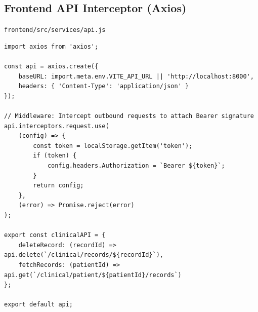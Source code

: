 \documentclass[a4paper,12pt]{report}
\begin{document}
\subsection*{Frontend API Interceptor (Axios)}
\texttt{frontend/src/services/api.js}

\begin{lstlisting}[caption={Axios HTTP interceptor for automatic JWT injection}]
import axios from 'axios';

const api = axios.create({
    baseURL: import.meta.env.VITE_API_URL || 'http://localhost:8000',
    headers: { 'Content-Type': 'application/json' }
});

// Middleware: Intercept outbound requests to attach Bearer signature
api.interceptors.request.use(
    (config) => {
        const token = localStorage.getItem('token');
        if (token) {
            config.headers.Authorization = `Bearer ${token}`;
        }
        return config;
    },
    (error) => Promise.reject(error)
);

export const clinicalAPI = {
    deleteRecord: (recordId) => api.delete(`/clinical/records/${recordId}`),
    fetchRecords: (patientId) => api.get(`/clinical/patient/${patientId}/records`)
};

export default api;
\end{lstlisting}
\end{document}
